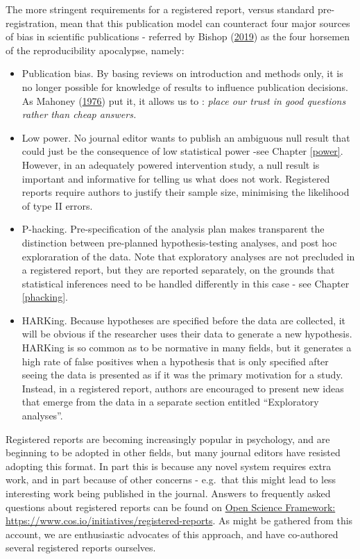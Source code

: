 \documentclass{krantz}
\begin{document}
The more stringent requirements for a registered report, versus standard pre-registration, mean that this publication model can counteract four major sources of bias in scientific publications - referred by Bishop (\protect\hyperlink{ref-bishop2019}{2019}) as the four horsemen of the reproducibility apocalypse, namely:

\begin{itemize}
\item
  Publication bias. By basing reviews on introduction and methods only, it is no longer possible for knowledge of results to influence publication decisions. As Mahoney (\protect\hyperlink{ref-mahoney1976}{1976}) put it, it allows us to : \emph{place our trust in good questions rather than cheap answers.}
\item
  Low power. No journal editor wants to publish an ambiguous null result that could just be the consequence of low statistical power -see Chapter \ref{power}. However, in an adequately powered intervention study, a null result is important and informative for telling us what does not work. Registered reports require authors to justify their sample size, minimising the likelihood of type II errors.
\item
  P-hacking. Pre-specification of the analysis plan makes transparent the distinction between pre-planned hypothesis-testing analyses, and post hoc exploraration of the data. Note that exploratory analyses are not precluded in a registered report, but they are reported separately, on the grounds that statistical inferences need to be handled differently in this case - see Chapter \ref{phacking}.
\item
  HARKing. Because hypotheses are specified before the data are collected, it will be obvious if the researcher uses their data to generate a new hypothesis. HARKing is so common as to be normative in many fields, but it generates a high rate of false positives when a hypothesis that is only specified after seeing the data is presented as if it was the primary motivation for a study. Instead, in a registered report, authors are encouraged to present new ideas that emerge from the data in a separate section entitled ``Exploratory analyses''.
\end{itemize}

Registered reports are becoming increasingly popular in psychology, and are beginning to be adopted in other fields, but many journal editors have resisted adopting this format. In part this is because any novel system requires extra work, and in part because of other concerns - e.g.~that this might lead to less interesting work being published in the journal. Answers to frequently asked questions about registered reports can be found on \href{https://www.cos.io/initiatives/registered-reports}{Open Science Framework: https://www.cos.io/initiatives/registered-reports}. As might be gathered from this account, we are enthusiastic advocates of this approach, and have co-authored several registered reports ourselves.
\end{document}

